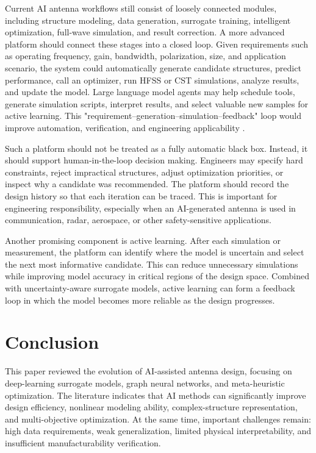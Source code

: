 \documentclass{article}
\begin{document}
Current AI antenna workflows still consist of loosely connected modules, including structure modeling, data generation, surrogate training, intelligent optimization, full-wave simulation, and result correction. A more advanced platform should connect these stages into a closed loop. Given requirements such as operating frequency, gain, bandwidth, polarization, size, and application scenario, the system could automatically generate candidate structures, predict performance, call an optimizer, run HFSS or CST simulations, analyze results, and update the model. Large language model agents may help schedule tools, generate simulation scripts, interpret results, and select valuable new samples for active learning. This "requirement--generation--simulation--feedback" loop would improve automation, verification, and engineering applicability \cite{fan2024surrogate}.

Such a platform should not be treated as a fully automatic black box. Instead, it should support human-in-the-loop decision making. Engineers may specify hard constraints, reject impractical structures, adjust optimization priorities, or inspect why a candidate was recommended. The platform should record the design history so that each iteration can be traced. This is important for engineering responsibility, especially when an AI-generated antenna is used in communication, radar, aerospace, or other safety-sensitive applications.

Another promising component is active learning. After each simulation or measurement, the platform can identify where the model is uncertain and select the next most informative candidate. This can reduce unnecessary simulations while improving model accuracy in critical regions of the design space. Combined with uncertainty-aware surrogate models, active learning can form a feedback loop in which the model becomes more reliable as the design progresses.

\section{Conclusion}

This paper reviewed the evolution of AI-assisted antenna design, focusing on deep-learning surrogate models, graph neural networks, and meta-heuristic optimization. The literature indicates that AI methods can significantly improve design efficiency, nonlinear modeling ability, complex-structure representation, and multi-objective optimization. At the same time, important challenges remain: high data requirements, weak generalization, limited physical interpretability, and insufficient manufacturability verification.
\end{document}
